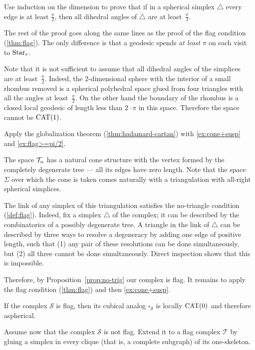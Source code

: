 Use induction on the dimension to prove that if in a spherical simplex $\triangle$ every edge is at least $\tfrac\pi2$, then
all dihedral angles of $\triangle$ are at least~$\tfrac\pi2$.

The rest of the proof goes along the same lines as the proof of the flag condition (\ref{thm:flag}).
The only difference is that a geodesic spends \textit{at least} $\pi$ on each visit to $\mathop{\rm Star}\nolimits_v$.

Note that it is not sufficient to assume that all dihedral angles of the simplices are at least~$\tfrac\pi2$.
Indeed, the 2-dimensional sphere with the interior of a small rhombus removed is a spherical polyhedral space glued from four triangles with all the angles at least~$\tfrac\pi2$.
On the other hand the boundary of the rhombus is a closed local geodesic of length less than $2\cdot\pi$ in this space.
Therefore the space cannot be $\mathrm{CAT}(1)$.

Apply the globalization theorem (\ref{thm:hadamard-cartan}) with \ref{ex:cone+susp} and \ref{ex:flag>=pi/2}. 

The space $\mathcal{T}_n$ has a natural cone structure with the vertex formed by the completely degenerate tree --- all its edges have zero length.
Note that the space $\Sigma$
over which the cone is taken comes naturally with a triangulation 
with all-right spherical simplices.

The link of any simplex of this triangulation satisfies the no-triangle condition (\ref{def:flag}).
Indeed, fix a simplex $\triangle$ of the complex;
it can be described by the combinatorics of a possibly degenerate tree.
A triangle in the link of $\triangle$ can be described by three ways to resolve a degeneracy by adding one edge of positive length,
such that (1) any pair of these resolutions can be done simultaneously, but (2) all three cannot be done simultaneously.
Direct inspection shows that this is impossible.

Therefore, by Proposition~\ref{prop:no-trig} our complex is flag.
It remains to apply the flag condition (\ref{thm:flag}) and then \ref{ex:cone+susp}.

If the complex $\mathcal{S}$ is flag, then its cubical analog $\square_{\mathcal{S}}$ is locally $\mathrm{CAT}(0)$ and therefore aspherical.

Assume now that the complex $\mathcal{S}$ is not flag. 
Extend it to a flag complex $\mathcal{T}$ by gluing a simplex in every clique (that is, a complete subgraph) of its one-skeleton.


